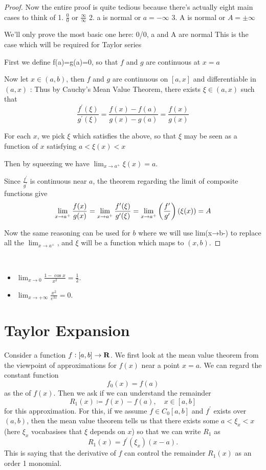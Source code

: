 \begin{proof}
Now the entire proof is quite tedious because there's actually eight main cases to think of
1. $\frac{0}{0}$ or $\frac{\infty}{\infty}$
2. a is normal or $a=-\infty$
3. A is normal or $A=\pm\infty$

We'll only prove the most basic one here:
0/0, a and A are normal
This is the case which will be required for Taylor series

First we define f(a)=g(a)=0, so that $f$ and $g$ are continuous at $x=a$

Now let $x\in(a,b)$, then $f$ and $g$ are continuous on $[a,x]$ and differentiable in $(a,x)$
:
Thus by Cauchy's Mean Value Theorem, there exists $\xi\in(a,x)$ such that
\[ \frac{f^\prime(\xi)}{g^\prime(\xi)}=\frac{f(x)-f(a)}{g(x)-g(a)}=\frac{f(x)}{g(x)} \]

For each $x$, we pick $\xi$ which satisfies the above, so that $\xi$ may be seen as a function of $x$ satisfying $a<\xi(x)<x$

Then by squeezing we have $\lim_{x\to a^+}\xi(x)=a$.

Since $\frac{f^\prime}{g^\prime}$ is continuous near $a$, the theorem regarding the limit of composite functions give
\[ \lim_{x\to a^+}\frac{f(x)}{g(x)} = \lim_{x\to a^+}\frac{f'(\xi)}{g'(\xi)} = \lim_{x\to a^+}\left(\frac{f^\prime}{g^\prime}\right)(\xi(x)) = A \]

Now the same reasoning can be used for $b$ where we will use lim(x→b-) to replace all the $\lim_{x\to a^+}$, and $\xi$ will be a function which maps to $(x,b)$.
\end{proof}

\begin{example} \
\begin{itemize}
\item $\lim_{x\to0}\frac{1-\cos x}{x^2}=\frac{1}{2}$.
\item $\lim_{x\to+\infty}\frac{x^2}{e^{3x}}=0.$
\end{itemize}
\end{example}

\section{Taylor Expansion}
Consider a function $f:[a,b]\to\mathbf R$. We first look at the mean value theorem from the viewpoint of approximations for $f(x)$ near a point $x=a$. We can regard the constant function
\[ f_0(x)=f(a) \]
as the  of $f(x)$. Then we ask if we can understand the remainder
\[ R_1(x)\coloneqq f(x)-f(a), \quad x\in[a,b] \]
for this approximation. For this, if we assume $f\in C_0[a,b]$ and $f^\prime$ exists over $(a,b)$, then the mean value theorem tells us that there exists some $a<\xi_x<x$ (here $\xi_x$ vocabasises that $\xi$ depends on $x$) so that we can write $R_1$ as
\[ R_1(x)=f^\prime(\xi_x)(x-a). \]
This is saying that the derivative of $f$ can control the remainder $R_1(x)$ as an order 1 monomial.



